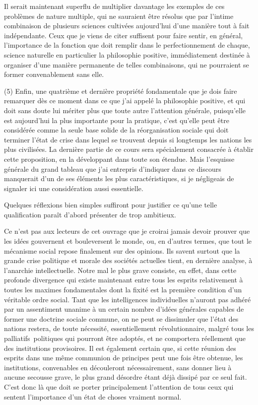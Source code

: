 \documentclass[french,twoside]{book} %
\begin{document}
Il serait maintenant superflu de multiplier davantage les exemples de ces problèmes de nature multiple, qui ne sauraient être résolus que par l’intime combinaison de plusieurs sciences cultivées aujourd’hui d’une manière tout à fait indépendante. Ceux que je viens de citer suffisent pour faire sentir, en général, l’importance de la fonction que doit remplir dans le perfectionnement de chaque, science naturelle en particulier la philosophie positive, immédiatement destinée à organiser d’une manière permanente de telles combinaisons, qui ne pourraient se former convenablement sans elle.\par
(5) Enfin, une quatrième et dernière propriété fondamentale que je dois faire remarquer dès ce moment dans ce que j’ai appelé la philosophie positive, et qui doit sans doute lui mériter plus que toute autre l’attention générale, puisqu’elle est aujourd’hui la plus importante pour la pratique, c’est qu’elle peut être considérée comme la seule base solide de la réorganisation sociale qui doit terminer l’état de crise dans lequel se trouvent depuis si longtemps les nations les plus civilisées. La dernière partie de ce cours sera spécialement consacrée à établir cette proposition, en la développant dans toute son étendue. Mais l’esquisse générale du grand tableau que j’ai entrepris d’indiquer dans ce discours manquerait d’un de ses éléments les plus caractéristiques, si je négligeais de signaler ici une considération aussi essentielle.\par
Quelques réflexions bien simples suffiront pour justifier ce qu’une telle qualification paraît d’abord présenter de trop ambitieux.\par
Ce n’est pas aux lecteurs de cet ouvrage que je croirai jamais devoir prouver que les idées gouvernent et bouleversent le monde, ou, en d’autres termes, que tout le mécanisme social repose finalement sur des opinions. Ils savent surtout que la grande crise politique et morale des sociétés actuelles tient, en dernière analyse, à l’anarchie intellectuelle. Notre mal le plus grave consiste, en effet, dans cette profonde divergence qui existe maintenant entre tous les esprits relativement à toutes les maximes fondamentales dont la fixité est la première condition d’un véritable ordre social. Tant que les intelligences individuelles n’auront pas adhéré par un assentiment unanime à un certain nombre d’idées générales capables de former une doctrine sociale commune, on ne peut se dissimuler que l’état des nations restera, de toute nécessité, essentiellement révolutionnaire, malgré tous les palliatifs politiques qui pourront être adoptés, et ne comportera réellement que des institutions provisoires. Il est également certain que, si cette réunion des esprits dans une même communion de principes peut une fois être obtenue, les institutions, convenables en découleront nécessairement, sans donner lieu à aucune secousse grave, le plus grand désordre étant déjà dissipé par ce seul fait. C’est donc là que doit se porter principalement l’attention de tous ceux qui sentent l’importance d’un état de choses vraiment normal.\par
\end{document}
